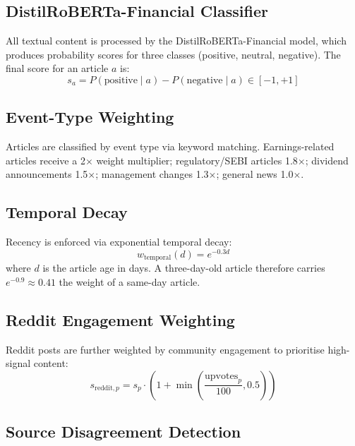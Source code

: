 \documentclass[10pt,a4paper,twoside]{article}
\begin{document}
\subsection{DistilRoBERTa-Financial Classifier}

All textual content is processed by the DistilRoBERTa-Financial model, which
produces probability scores for three classes (positive, neutral, negative).
The final score for an article $a$ is:
\begin{equation}
  s_a = P(\text{positive} \mid a) - P(\text{negative} \mid a) \in [-1, +1]
\end{equation}

\subsection{Event-Type Weighting}

Articles are classified by event type via keyword matching. Earnings-related
articles receive a 2$\times$ weight multiplier; regulatory/SEBI articles 1.8$\times$;
dividend announcements 1.5$\times$; management changes 1.3$\times$; general
news 1.0$\times$.

\subsection{Temporal Decay}

Recency is enforced via exponential temporal decay:
\begin{equation}
  w_{\text{temporal}}(d) = e^{-0.3 d}
\end{equation}
where $d$ is the article age in days. A three-day-old article therefore carries
$e^{-0.9} \approx 0.41$ the weight of a same-day article.

\subsection{Reddit Engagement Weighting}

Reddit posts are further weighted by community engagement to prioritise
high-signal content:
\begin{equation}
  s_{\text{reddit},p} = s_p \cdot \left(1 + \min\!\left(\frac{\text{upvotes}_p}{100}, 0.5\right)\right)
\end{equation}

\subsection{Source Disagreement Detection}
\end{document}

